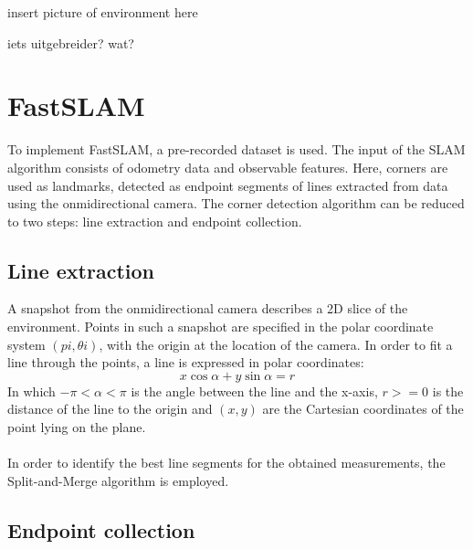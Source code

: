 \documentclass[12pt]{article}
\begin{document}
insert picture of environment here

iets uitgebreider? wat?

\section{FastSLAM}
To implement FastSLAM, a pre-recorded dataset is used. The input of the SLAM algorithm consists of odometry data and observable features. Here, corners are used as landmarks, detected as endpoint segments of lines extracted from data using the onmidirectional camera. The corner detection algorithm can be reduced to two steps: line extraction and endpoint collection.
\subsection{Line extraction}
A snapshot from the onmidirectional camera describes a 2D slice of the environment. Points in such a snapshot are specified in the polar coordinate system $(pi, {\theta}i)$, with the origin at the location of the camera. In order to fit a line through the points, a line is expressed in polar coordinates:
\begin{equation}
	x\cos{\alpha} + y\sin{\alpha} = r
\end{equation}
In which $-\pi < \alpha < \pi$ is the angle between the line and the x-axis, $r >= 0$ is the distance of the line to the origin and $(x, y)$ are the Cartesian coordinates of the point lying on the plane. \\ \\
In order to identify the best line segments for the obtained measurements, the Split-and-Merge algorithm is employed.
\subsection{Endpoint collection}
\end{document}
